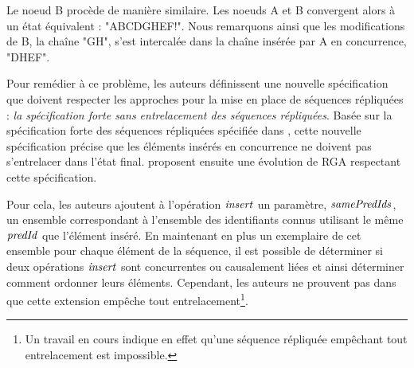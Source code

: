Le noeud B procède de manière similaire.
Les noeuds A et B convergent alors à un état équivalent : "ABCDGHEF!".
Nous remarquons ainsi que les modifications de B, la chaîne "GH", s'est intercalée dans la chaîne insérée par A en concurrence, "DHEF".

Pour remédier à ce problème, les auteurs définissent une nouvelle spécification que doivent respecter les approches pour la mise en place de séquences répliquées : \emph{la spécification forte sans entrelacement des séquences répliquées}.
Basée sur la spécification forte des séquences répliquées spécifiée dans \cite{2016-specification-complexity-collaborative-text-editing-attiya, 2021-specification-complexity-collaborative-text-editing-attiya}, cette nouvelle spécification précise que les éléments insérés en concurrence ne doivent pas s'entrelacer dans l'état final.
\textcite{2019-interleaving-anomalies-collaborative-editors-kleppmann} proposent ensuite une évolution de \ac{RGA} respectant cette spécification.

Pour cela, les auteurs ajoutent à l'opération $\mathit{insert}$ un paramètre, $\mathit{samePredIds}$, un ensemble correspondant à l'ensemble des identifiants connus utilisant le même $\mathit{predId}$ que l'élément inséré.
En maintenant en plus un exemplaire de cet ensemble pour chaque élément de la séquence, il est possible de déterminer si deux opérations $\mathit{insert}$ sont concurrentes ou causalement liées et ainsi déterminer comment ordonner leurs éléments.
Cependant, les auteurs ne prouvent pas dans \cite{2019-interleaving-anomalies-collaborative-editors-kleppmann} que cette extension empêche tout entrelacement\footnote{Un travail en cours \cite{2022-no-doubly-non-interleaving-crdts-weidner} indique en effet qu'une séquence répliquée empêchant tout entrelacement est impossible.}.
